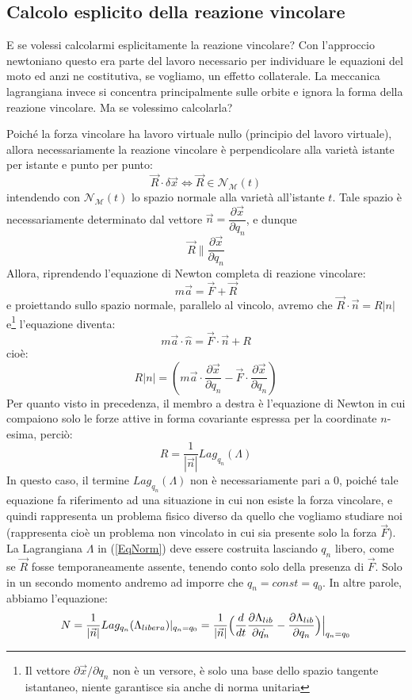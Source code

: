 \documentclass[a4paper,openany]{article}
\begin{document}
	\subsection{Calcolo esplicito della reazione vincolare}
	E se volessi calcolarmi esplicitamente la reazione vincolare? Con l'approccio newtoniano questo era parte del lavoro necessario per individuare le equazioni del moto ed anzi ne costitutiva, se vogliamo, un effetto collaterale. La meccanica lagrangiana invece si concentra principalmente sulle orbite e ignora la forma della reazione vincolare. Ma se volessimo calcolarla? 
	
	Poiché la forza vincolare ha lavoro virtuale nullo (principio del lavoro virtuale), allora necessariamente la reazione vincolare è perpendicolare alla varietà istante per istante e punto per punto:
	$$
	\vec{R} \cdot \delta \vec{x} \iff \vec{R} \in \mathcal{N}_{\mathcal{M}}(t)
	$$
	intendendo con $\mathcal{N}_{\mathcal{M}}(t)$ lo spazio normale alla varietà all'istante $t$. Tale spazio è necessariamente determinato dal vettore $\vec{n} = \dfrac{\partial \vec{x}}{\partial q_n}$, e dunque
	$$
	\vec{R} \parallel \dfrac{\partial \vec{x}}{\partial q_n}
	$$
	Allora, riprendendo l'equazione di Newton completa di reazione vincolare:
	$$
	m\vec{a} = \vec{F} + \vec{R}
	$$
	e proiettando sullo spazio normale, parallelo al vincolo, avremo che $\vec{R}\cdot\vec{n} = R|n|$ e\footnote{Il vettore $\partial\vec{x}/\partial q_n$ non è un versore, è solo una base dello spazio tangente istantaneo, niente garantisce sia anche di norma unitaria} l'equazione diventa:
	$$
	m\vec{a}\cdot\hat{n} = \vec{F}\cdot\vec{n} + R
	$$
	cioè:
	$$
	R |n| = (m\vec{a}\cdot\dfrac{\partial \vec{x}}{\partial q_n} - \vec{F}\cdot \dfrac{\partial \vec{x}}{\partial q_n})
	$$
	Per quanto visto in precedenza, il membro a destra è l'equazione di Newton in cui compaiono solo le forze attive in forma covariante espressa per la coordinate $n$-esima, perciò:
	\begin{equation}
		R =\dfrac{1}{|\vec{n}|} Lag_{q_n}(\Lambda)
		\label{EqNorm}
	\end{equation}
	In questo caso, il termine $Lag_{q_n}(\Lambda)$ non è necessariamente pari a 0, poiché tale equazione fa riferimento ad una situazione in cui non esiste la forza vincolare, e quindi rappresenta un problema fisico diverso da quello che vogliamo studiare noi (rappresenta cioè un problema non vincolato in cui sia presente solo la forza $\vec{F}$). La Lagrangiana $\Lambda$ in (\ref{EqNorm}) deve essere costruita lasciando $q_n$ libero, come se $\vec{R}$ fosse temporaneamente assente, tenendo conto solo della presenza di $\vec{F}$. Solo in un secondo momento andremo ad imporre che $q_n = const = q_0$. In altre parole, abbiamo l'equazione:
	\begin{equation}
		N = \dfrac{1}{|\vec{n}|}Lag_{q_n}(\Lambda_{libera})|_{q_n=q_0} =  \dfrac{1}{|\vec{n}|}\Bigl(\dfrac{d}{dt}\dfrac{\partial \Lambda_{lib}}{\partial \dot{q_n}} - \dfrac{\partial \Lambda_{lib}}{\partial q_n}\Bigl)\Bigl|_{q_n = q_0}
		\label{ReazioneVincolare}
	\end{equation}
	
\end{document}
